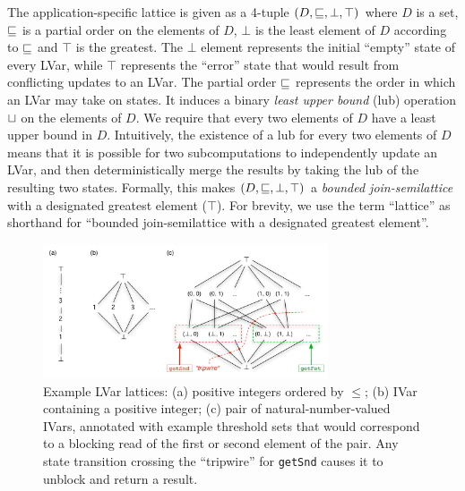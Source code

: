 \documentclass{article}
\begin{document}
The application-specific lattice is given as a 4-tuple $(D, \sqsubseteq,
\bot, \top)$ where $D$ is a set, $\sqsubseteq$ is a partial order on the
elements of $D$, $\bot$ is the least element of $D$ according to
$\sqsubseteq$ and $\top$ is the greatest.  The $\bot$ element represents
the initial ``empty'' state of every LVar, while $\top$ represents the
``error'' state that would result from conflicting updates to an LVar.
The partial order $\sqsubseteq$ represents the order in which an LVar may
take on states.  It induces a binary \emph{least upper bound} (lub)
operation $ \sqcup $ on the elements of $D$.  We require that
every two elements of $D$ have a least upper bound in $D$.
Intuitively, the existence of a lub for every two elements of $D$
means that it is possible for two subcomputations to independently
update an LVar, and then deterministically merge the results by taking
the lub of the resulting two states.  Formally, this makes $(D,
\sqsubseteq, \bot, \top)$ a \emph{bounded join-semilattice} with a
designated greatest element ($\top$).  For brevity, we use the term
``lattice'' as shorthand for ``bounded join-semilattice with a
designated greatest element''.

\begin{figure}
\centering
\includegraphics[width=0.75\textwidth]{figures/example-lvar-lattices.pdf} 
  \caption{Example LVar lattices: (a) positive integers ordered by
    $\leq$; (b) IVar containing a positive integer; (c) pair of
    natural-number-valued IVars, annotated with example threshold sets
    that would correspond to a blocking read of the first or second
    element of the pair.  Any state transition crossing the
    ``tripwire'' for \lstinline{getSnd} causes it to unblock and
    return a result.}

  \label{f:lattice-examples}
\end{figure}
\end{document}
